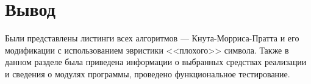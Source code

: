 \section{Вывод}

Были представлены листинги всех алгоритмов --- Кнута-Морриса-Пратта и его модификации с использованием эвристики <<плохого>> символа. 
Также в данном разделе была приведена информации о выбранных средствах реализации и сведения о модулях программы, проведено функциональное тестирование.
